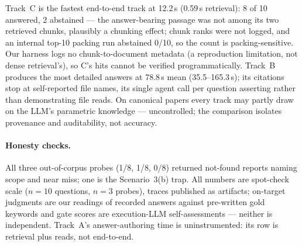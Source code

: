 Track~C is the fastest end-to-end track at 12.2\,s (0.59\,s retrieval): 8 of 10
answered, 2 abstained --- the answer-bearing passage was not among its two
retrieved chunks, plausibly a chunking effect; chunk ranks were not logged, and
an internal top-10 packing run abstained 0/10, so the count is
packing-sensitive. Our harness logs no chunk-to-document metadata (a
reproduction limitation, not dense retrieval's), so C's hits cannot be verified
programmatically.
Track~B produces the most detailed answers at 78.8\,s mean (35.5--165.3\,s); its
citations stop at self-reported file names, its single agent call per question
asserting rather than demonstrating file reads. On canonical papers every track
may partly draw on the LLM's parametric knowledge --- uncontrolled; the
comparison isolates provenance and auditability, not accuracy.

\paragraph{Honesty checks.}
All three out-of-corpus probes (1/8, 1/8, 0/8) returned not-found reports
naming scope and near miss; one is the Scenario~3(b) trap. All numbers are
spot-check scale ($n{=}10$ questions, $n{=}3$ probes), traces published as
artifacts; on-target judgments are our readings of recorded answers against
pre-written gold keywords and gate scores are execution-LLM self-assessments ---
neither is independent. Track~A's answer-authoring time is uninstrumented: its
row is retrieval plus reads, not end-to-end.
